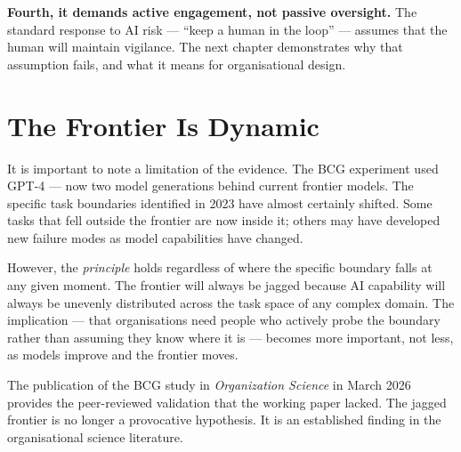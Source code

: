 \textbf{Fourth, it demands active engagement, not passive oversight.} The standard response to AI risk --- ``keep a human in the loop'' --- assumes that the human will maintain vigilance. The next chapter demonstrates why that assumption fails, and what it means for organisational design.

\section{The Frontier Is Dynamic}

It is important to note a limitation of the evidence. The BCG experiment used GPT-4 --- now two model generations behind current frontier models. The specific task boundaries identified in 2023 have almost certainly shifted. Some tasks that fell outside the frontier are now inside it; others may have developed new failure modes as model capabilities have changed.

However, the \emph{principle} holds regardless of where the specific boundary falls at any given moment. The frontier will always be jagged because AI capability will always be unevenly distributed across the task space of any complex domain. The implication --- that organisations need people who actively probe the boundary rather than assuming they know where it is --- becomes more important, not less, as models improve and the frontier moves.

The publication of the BCG study in \emph{Organization Science} in March 2026 \parencite{DellAcqua2026} provides the peer-reviewed validation that the working paper lacked. The jagged frontier is no longer a provocative hypothesis. It is an established finding in the organisational science literature.
